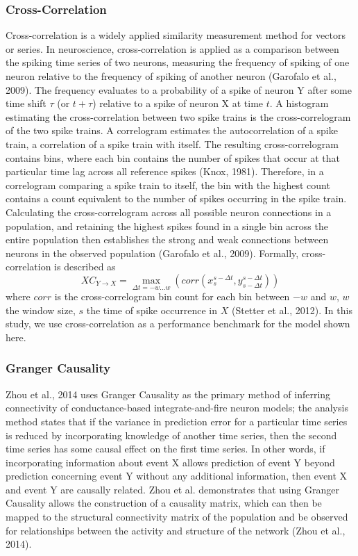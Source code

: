 \documentclass[11pt,titlepage]{article}
\begin{document}
\subsubsection{Cross-Correlation}
Cross-correlation is a widely applied similarity measurement method for vectors or series. In neuroscience, cross-correlation is applied as a comparison between the spiking time series of two neurons, measuring the frequency of spiking of one neuron relative to the frequency of spiking of another neuron (Garofalo et al., 2009). The frequency evaluates to a probability of a spike of neuron Y after some time shift $\tau$ (or $t + \tau$) relative to a spike of neuron X at time $t$. A histogram estimating the cross-correlation between two spike trains is the cross-correlogram of the two spike trains. A correlogram estimates the autocorrelation of a spike train, a correlation of a spike train with itself. The resulting cross-correlogram contains bins, where each bin contains the number of spikes that occur at that particular time lag across all reference spikes (Knox, 1981). Therefore, in a correlogram comparing a spike train to itself, the bin with the highest count contains a count equivalent to the number of spikes occurring in the spike train. Calculating the cross-correlogram across all possible neuron connections in a population, and retaining the highest spikes found in a single bin across the entire population then establishes the strong and weak connections between neurons in the observed population (Garofalo et al., 2009). Formally, cross-correlation is described as
$$XC_{Y \rightarrow X} = \max_{\Delta t = -w ... w} (corr(x_s^{s-\Delta t},y_{s-\Delta t}^{s-\Delta t} ))$$
where $corr$ is the cross-correlogram bin count for each bin between $-w$ and $w$, $w$ the window size, $s$ the time of spike occurrence in $X$ (Stetter et al., 2012). In this study, we use cross-correlation as a performance benchmark for the model shown here.

\subsubsection{Granger Causality}
Zhou et al., 2014 uses Granger Causality as the primary method of inferring connectivity of conductance-based integrate-and-fire neuron models; the analysis method states that if the variance in prediction error for a particular time series is reduced by incorporating knowledge of another time series, then the second time series has some causal effect on the first time series. In other words, if incorporating information about event X allows prediction of event Y beyond prediction concerning event Y without any additional information, then event X and event Y are causally related. Zhou et al. demonstrates that using Granger Causality allows the construction of a causality matrix, which can then be mapped to the structural connectivity matrix of the population and be observed for relationships between the activity and structure of the network (Zhou et al., 2014).\par
\end{document}
